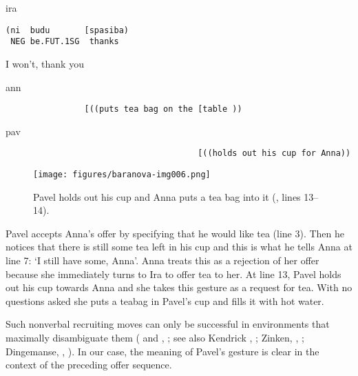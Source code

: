 \documentclass[output=paper,modfonts,nonflat]{langsci/langscibook}
\begin{document}
%
%
\begin{transbox}{11}{ira}
\begin{verbatim}
(ni  budu       [spasiba)
 NEG be.FUT.1SG  thanks
\end{verbatim}
\hspace{0.07cm} I won't, thank you
\end{transbox}
%
\begin{transbox}{12}{ann}
\begin{verbatim}
                [((puts tea bag on the [table ))
\end{verbatim}
\end{transbox}
%
\begin{mdframednoverticalspace}[style=firstfoc]
\begin{transbox}{13}{pav}
\begin{verbatim}
                                       [((holds out his cup for Anna))
\end{verbatim}
\end{transbox}
\end{mdframednoverticalspace}
%
\begin{mdframednoverticalspace}[style=secondfoc]
\end{mdframednoverticalspace}
%
\begin{mdframednoverticalspace}[style=secondfoc]
\end{mdframednoverticalspace}

\begin{figure}
\texttt{[image: figures/baranova-img006.png]}
\caption{Pavel holds out his cup and Anna puts a tea bag into it (, lines 13--14).}
\label{fig:baranova:6}
\end{figure}

Pavel accepts Anna's offer by specifying that he would like tea (line 3). Then he notices that there is still some tea left in his cup and this is what he tells Anna at line 7: ‘I still have some, Anna’. Anna treats this as a rejection of her offer because she immediately turns to Ira to offer tea to her. At line 13, Pavel holds out his cup towards Anna and she takes this gesture as a request for tea. With no questions asked she puts a teabag in Pavel’s cup and fills it with hot water. 

Such nonverbal recruiting moves can only be successful in environments that maximally disambiguate them (\citealt{Rossi2014} and , ; see also Kendrick , ; Zinken, , ; Dingemanse, , ). In our case, the meaning of Pavel’s gesture is clear in the context of the preceding offer sequence.
\end{document}
